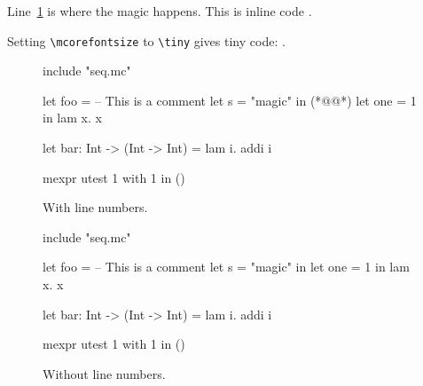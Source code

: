 \documentclass{article}
\begin{document}
Line~\ref{l:magic} is where the magic happens. This is inline code
.

\def \mcorefontsize {\tiny}
%
Setting \verb|\mcorefontsize| to \verb|\tiny| gives tiny code: .
%
\def \mcorefontsize {\normalsize}

\begin{figure}[h]
  \begin{mcore-lines}
  include "seq.mc"

  let foo =
    -- This is a comment
    let s = "magic" in (*@\label{l:magic}@*)
    let one = 1 in
    lam x. x

  let bar: Int -> (Int -> Int) =
    lam i.
    addi i

  mexpr
    utest 1 with 1 in ()
  \end{mcore-lines}
  \caption{With line numbers.}
\end{figure}

\begin{figure}[h]
  \begin{mcore}
  include "seq.mc"

  let foo =
    -- This is a comment
    let s = "magic" in
    let one = 1 in
    lam x. x

  let bar: Int -> (Int -> Int) =
    lam i.
    addi i

  mexpr
    utest 1 with 1 in ()
  \end{mcore}
  \caption{Without line numbers.}
\end{figure}


\end{document}
